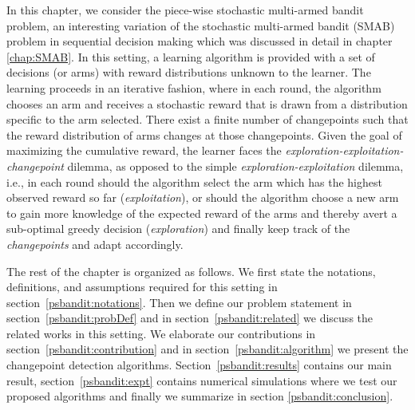 In this chapter, we consider the piece-wise stochastic multi-armed bandit problem, an interesting variation of the stochastic multi-armed bandit (SMAB) problem in sequential decision making which was discussed in detail in chapter \ref{chap:SMAB}. In this setting,  a learning algorithm is provided with a set of decisions (or arms) with reward distributions unknown to the learner. The learning proceeds in an iterative fashion, where in each round, the algorithm chooses an arm and receives a stochastic reward that is drawn from a distribution specific to the arm selected. There exist a finite number of changepoints such that the reward distribution of arms changes at those changepoints. Given the goal of maximizing the cumulative reward, the learner faces the \textit{exploration-exploitation-changepoint} dilemma, as opposed to the simple \textit{exploration-exploitation} dilemma, i.e., in each round should the algorithm select the arm which has the highest observed reward so far (\textit{exploitation}), or should the algorithm choose a new arm to gain more knowledge of the expected reward of the arms and thereby avert a sub-optimal greedy decision (\textit{exploration}) and finally keep track of the \textit{changepoints} and adapt accordingly.

    The rest of the chapter is organized as follows. We first state the notations, definitions, and assumptions required for this setting in section~\ref{psbandit:notations}. Then we define our problem statement in section~\ref{psbandit:probDef} and in section~\ref{psbandit:related} we discuss the related works in this setting. We elaborate our contributions in section~\ref{psbandit:contribution} and in section~\ref{psbandit:algorithm} we present the changepoint detection algorithms. Section~\ref{psbandit:results} contains our main result, section~\ref{psbandit:expt} contains numerical simulations where we test our proposed algorithms and finally we summarize in section \ref{psbandit:conclusion}. 

